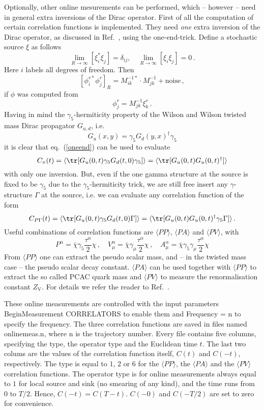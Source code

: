 Optionally, other online mesurements can be performed, which --
however -- need in general extra inversions of the Dirac
operator. First of all the computation of certain correlation
functions is implemented. They need \emph{one} extra inversion of the
Dirac operator, as discussed in Ref.~\cite{Boucaud:2008xu}, using the
one-end-trick. Define a stochastic source $\xi$ as follows
\begin{equation}
  \label{eq:source}
  \lim_{R\to\infty}[\xi_i^*\xi_j] = \delta_{ij},\quad
  \lim_{R\to\infty}[\xi_i\xi_j] = 0\, .
\end{equation}
Here $i$ labels all degrees of freedom. Then
\begin{equation}
  \label{oneend}
  [\phi_i^{r*}\phi_j^r]_R = M_{ik}^{-1*}\cdot M_{jk}^{-1} +
  \textrm{noise}\, ,
\end{equation}
if $\phi$ was computed from
\[
\phi_j^r  = M^{-1}_{jk}\xi_k^r\, .
\]
Having in mind the $\gamma_5$-hermiticity property of the Wilson and
Wilson twisted mass Dirac propagator $G_{u,d}$, i.e.
\[
G_u(x,y) = \gamma_5 G_d(y,x)^\dagger \gamma_5
\]
it is clear that eq.~(\ref{oneend}) can be used to evaluate
\[
C_\pi(t) = \langle \tr[G_u(0,t)\gamma_5 G_d(t,0)\gamma_5]\rangle =
\langle \tr[G_u(0,t) G_u(0,t)^\dagger]\rangle
\]
with only one inversion. But, even if the one gamma structure at the
source is fixed to be $\gamma_5$ due to the $\gamma_5$-hermiticity
trick, we are still free insert any $\gamma$-structure $\Gamma$ at the source,
i.e. we can evaluate any correlation function of the form
\[
C_{P\Gamma}(t) = \langle\tr[G_u(0,t) \gamma_5 G_d(t,0) \Gamma]\rangle
= \langle \tr[G_u(0,t) G_u(0,t)^\dagger\gamma_5\Gamma]\rangle\, .
\]
Useful combinations of correlation functions are $\langle P P\rangle$,
$\langle PA\rangle$ and $\langle PV\rangle$, with
\[
  P^\alpha = \bar\chi \gamma_5 \frac{\tau^\alpha}{2}\chi\, ,\quad
  V^\alpha_\mu = \bar\chi \gamma_\mu\frac{\tau^\alpha}{2}\chi\, ,\quad
  A^\alpha_\mu = \bar\chi \gamma_5\gamma_\mu\frac{\tau^\alpha}{2}\chi
\]
From $\langle P P\rangle$ one can extract the pseudo scalar mass, and
-- in the twisted mass case -- the pseudo scalar decay
constant. $\langle PA\rangle$ can be used together with $\langle P
P\rangle$ to extract the so called PCAC quark mass and $\langle
PV\rangle$ to measure the renormalisation constant $Z_\mathrm{V}$. For
details we refer the reader to Ref.~\cite{Boucaud:2008xu}.

These online measurements are controlled with the input parameters
{\ttfamily BeginMeasurement CORRELATORS} to enable them  and
{\ttfamily Frequency = n} to specify the frequency. The three
correlation functions are saved in files named {\ttfamily
  onlinemeas.n}, where {\ttfamily n} is the trajectory number. Every
file contains five columns, specifying the type, the operator type and the
Euclidean time $t$. The last two colums are the values of the
correlation function itself, $C(t)$ and $C(-t)$, respectively. The
type is equal to $1$, $2$ or $6$ for the $\langle P P\rangle$, the
$\langle PA\rangle$ and the $\langle PV\rangle$ correlation
functions. The operator type is for online measurements always equal
to $1$ for local source and sink (no smearing of any kind), and the
time runs from $0$ to $T/2$. Hence, $C(-t)= C(T-t)$. $C(-0)$ and
$C(-T/2)$ are set to zero for convenience.

